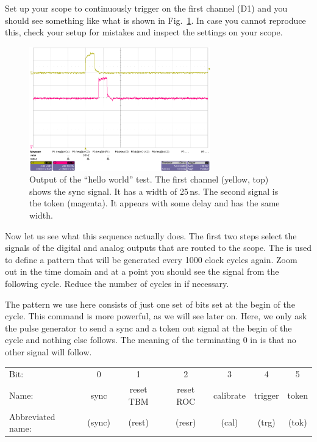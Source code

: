 Set up your scope to continuously trigger on the first channel (D1) and you should see something like what is shown in Fig.~\ref{fig:tut_scope1}. In case you cannot reproduce this, check your setup for mistakes and inspect the settings on your scope.
\begin{figure}[h]
    \begin{center}
	\includegraphics[width=0.7\textwidth]{img/tut_scope1.png}
	\caption{Output of the \enquote{hello world} test. The first channel (yellow, top) shows the sync signal. It has a width of 25\,ns. The second signal is the token (magenta). It appears with some delay and has the same width.}
	\label{fig:tut_scope1}
    \end{center}
\end{figure}

Now let us see what this sequence actually does.  The first two steps select the signals of the digital and analog outputs that are routed to the scope. The  is used to define a pattern that will be generated every 1000 clock cycles again. Zoom out in the time domain and at a point you should see the signal from the following cycle. Reduce the number of cycles in  if necessary.

The pattern we use here consists of just one set of bits set at the begin of the cycle. This command is more powerful, as we will see later on. Here, we only ask the pulse generator to send a sync and a token out signal at the begin of the cycle and nothing else follows. The meaning of the terminating 0 in  is that no other signal will follow.
\begin{center}
\begin{tabular}{lcccccc}
    \toprule
Bit:  & 0 & 1 & 2 & 3 & 4 & 5 \\
Name: & sync & reset TBM & reset ROC & calibrate & trigger & token \\
Abbreviated name: & (sync) & (rest) & (resr) & (cal) & (trg) & (tok) \\
    \bottomrule
\end{tabular}
\end{center}

